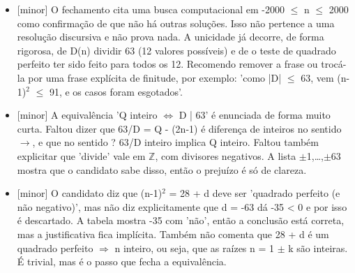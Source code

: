 \documentclass{article}%
\begin{document}
\begin{itemize}%
\item%
{[}minor{]} O fechamento cita uma busca computacional em {-}2000 $\leq$ n $\leq$ 2000 como confirmação de que não há outras soluções. Isso não pertence a uma resolução discursiva e não prova nada. A unicidade já decorre, de forma rigorosa, de D(n) dividir 63 (12 valores possíveis) e de o teste de quadrado perfeito ter sido feito para todos os 12. Recomendo remover a frase ou trocá{-}la por uma frase explícita de finitude, por exemplo: 'como |D| $\leq$ 63, vem (n-1)$^2$ $\leq$ 91, e os casos foram esgotados'.%
\item%
{[}minor{]} A equivalência 'Q inteiro $\Leftrightarrow$ D | 63' é enunciada de forma muito curta. Faltou dizer que 63/D = Q - (2n-1) é diferença de inteiros no sentido $\to$, e que no sentido ? 63/D inteiro implica Q inteiro. Faltou também explicitar que 'divide' vale em $\mathbb{Z}$, com divisores negativos. A lista $\pm$1,\ldots{},$\pm$63 mostra que o candidato sabe disso, então o prejuízo é só de clareza.%
\item%
{[}minor{]} O candidato diz que (n-1)$^2$ = 28 + d deve ser 'quadrado perfeito (e não negativo)', mas não diz explicitamente que d = -63 dá -35 < 0 e por isso é descartado. A tabela mostra -35 com 'não', então a conclusão está correta, mas a justificativa fica implícita. Também não comenta que 28 + d é um quadrado perfeito $\Rightarrow$ n inteiro, ou seja, que as raízes n = 1 $\pm$ k são inteiras. É trivial, mas é o passo que fecha a equivalência.%
\end{itemize}%
\end{document}
